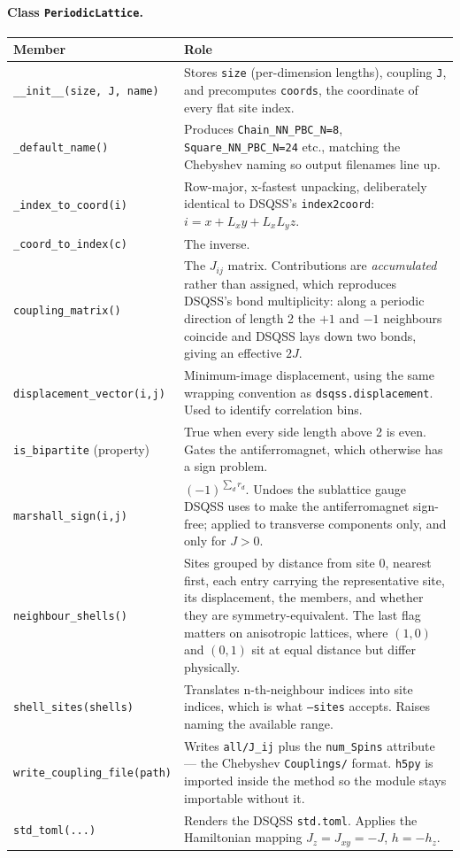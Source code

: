 \documentclass[11pt,a4paper]{article}
\newcommand{\code}[1]{\texttt{#1}}
\begin{document}
\paragraph{Class \code{PeriodicLattice}.}

\begin{longtable}{@{}p{}p{}@{}}
\toprule
Member & Role \\
\midrule
\endhead
\code{\_\_init\_\_(size, J, name)} &
  Stores \code{size} (per-dimension lengths), coupling \code{J}, and precomputes
  \code{coords}, the coordinate of every flat site index. \\
\code{\_default\_name()} &
  Produces \code{Chain\_NN\_PBC\_N=8}, \code{Square\_NN\_PBC\_N=24} etc.,
  matching the Chebyshev naming so output filenames line up. \\
\code{\_index\_to\_coord(i)} &
  Row-major, x-fastest unpacking, deliberately identical to DSQSS's
  \code{index2coord}: $i = x + L_x y + L_x L_y z$. \\
\code{\_coord\_to\_index(c)} & The inverse. \\
\code{coupling\_matrix()} &
  The $J_{ij}$ matrix. Contributions are \emph{accumulated} rather than
  assigned, which reproduces DSQSS's bond multiplicity: along a periodic
  direction of length 2 the $+1$ and $-1$ neighbours coincide and DSQSS lays
  down two bonds, giving an effective $2J$. \\
\code{displacement\_vector(i,j)} &
  Minimum-image displacement, using the same wrapping convention as
  \code{dsqss.displacement}. Used to identify correlation bins. \\
\code{is\_bipartite} (property) &
  True when every side length above 2 is even. Gates the antiferromagnet, which
  otherwise has a sign problem. \\
\code{marshall\_sign(i,j)} &
  $(-1)^{\sum_d r_d}$. Undoes the sublattice gauge DSQSS uses to make the
  antiferromagnet sign-free; applied to transverse components only, and only
  for $J>0$. \\
\code{neighbour\_shells()} &
  Sites grouped by distance from site 0, nearest first, each entry carrying the
  representative site, its displacement, the members, and whether they are
  symmetry-equivalent. The last flag matters on anisotropic lattices, where
  $(1,0)$ and $(0,1)$ sit at equal distance but differ physically. \\
\code{shell\_sites(shells)} &
  Translates n-th-neighbour indices into site indices, which is what
  \code{--sites} accepts. Raises naming the available range. \\
\code{write\_coupling\_file(path)} &
  Writes \code{all/J\_ij} plus the \code{num\_Spins} attribute --- the
  Chebyshev \code{Couplings/} format. \code{h5py} is imported inside the method
  so the module stays importable without it. \\
\code{std\_toml(...)} &
  Renders the DSQSS \code{std.toml}. Applies the Hamiltonian mapping
  $J_z = J_{xy} = -J$, $h = -h_z$. \\
\bottomrule
\end{longtable}
\end{document}
